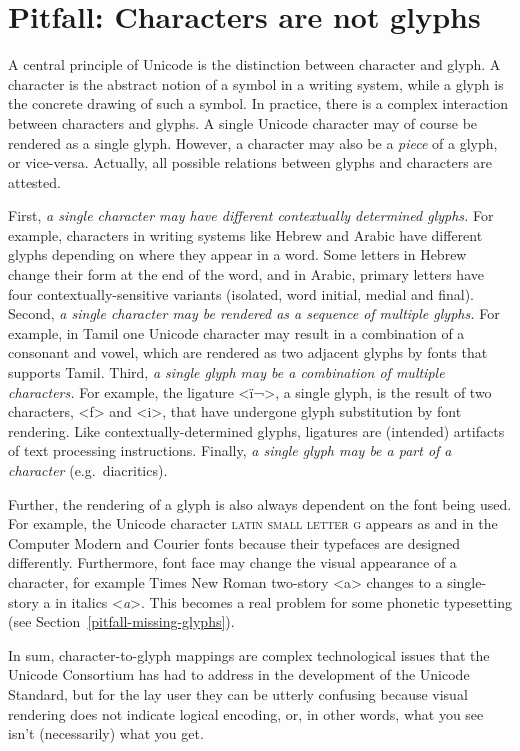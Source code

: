 \section{Pitfall: Characters are not glyphs}
\label{pitfall-characters-are-not-glyphs}

A central principle of Unicode is the distinction between character and glyph. A
character is the abstract notion of a symbol in a writing system, while a glyph
is the concrete drawing of such a symbol. In practice, there is a complex
interaction between characters and glyphs. A single Unicode character may of
course be rendered as a single glyph. However, a character may also be a
\textit{piece} of a glyph, or vice-versa. Actually, all possible relations
between glyphs and characters are attested.

First, \textit{a single character may have different contextually determined
glyphs.} For example, characters in writing systems like Hebrew and Arabic have
different glyphs depending on where they appear in a word. Some letters in
Hebrew change their form at the end of the word, and in Arabic, primary letters
have four contextually-sensitive variants (isolated, word initial, medial and
final). Second, \textit{a single character may be rendered as a sequence of
multiple glyphs.} For example, in Tamil one Unicode character may result in a
combination of a consonant and vowel, which are rendered as two adjacent glyphs
by fonts that supports Tamil. Third, \textit{a single glyph may be a combination
of multiple characters.} For example, the ligature <ï¬>, a single glyph, is the
result of two characters, <f> and <i>, that have undergone glyph substitution by
font rendering. Like contextually-determined glyphs, ligatures are (intended)
artifacts of text processing instructions. Finally, \textit{a single glyph may
be a part of a character} (e.g.~diacritics).

Further, the rendering of a glyph is also always dependent on the font being
used. For example, the Unicode character \textsc{latin small letter g} appears
as and in the Computer Modern and Courier fonts because their typefaces are
designed differently. Furthermore, font face may change the visual appearance of
a character, for example Times New Roman two-story <a> changes to a single-story
a in italics <\emph{a}>. This becomes a real problem for some phonetic
typesetting (see Section~\ref{pitfall-missing-glyphs}).

In sum, character-to-glyph mappings are complex technological issues that the
Unicode Consortium has had to address in the development of the Unicode
Standard, but for the lay user they can be utterly confusing because visual
rendering does not indicate logical encoding, or, in other words, what you see
isn't (necessarily) what you get.

